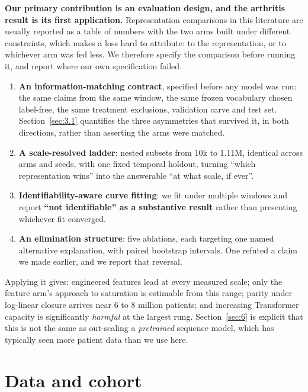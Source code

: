 \documentclass[10pt,twocolumn,letterpaper]{article}
\begin{document}
\textbf{Our primary contribution is an evaluation design, and the arthritis result is its first application.} Representation comparisons in this literature are usually reported as a table of numbers with the two arms built under different constraints, which makes a loss hard to attribute: to the representation, or to whichever arm was fed less. We therefore specify the comparison before running it, and report where our own specification failed.



\begin{enumerate}
\item \textbf{An information-matching contract}, specified before any model was run: the same claims from the same window, the same frozen vocabulary chosen label-free, the same treatment exclusions, validation carve and test set. Section~\ref{sec:3.1} quantifies the three asymmetries that survived it, in both directions, rather than asserting the arms were matched.
\item \textbf{A scale-resolved ladder}: nested subsets from 10k to 1.11M, identical across arms and seeds, with one fixed temporal holdout, turning ``which representation wins'' into the answerable ``at what scale, if ever''.
\item \textbf{Identifiability-aware curve fitting}: we fit under multiple windows and report \textbf{``not identifiable'' as a substantive result} rather than presenting whichever fit converged.
\item \textbf{An elimination structure}: five ablations, each targeting one named alternative explanation, with paired bootstrap intervals. One refuted a claim we made earlier, and we report that reversal.
\end{enumerate}



Applying it gives: engineered features lead at every measured scale; only the feature arm's approach to saturation is estimable from this range; parity under log-linear closure arrives near 6 to 8 million patients; and increasing Transformer capacity is significantly \emph{harmful} at the largest rung. Section~\ref{sec:6} is explicit that this is not the same as out-scaling a \emph{pretrained} sequence model, which has typically seen more patient data than we use here.







\section{Data and cohort}\label{sec:2}
\end{document}
